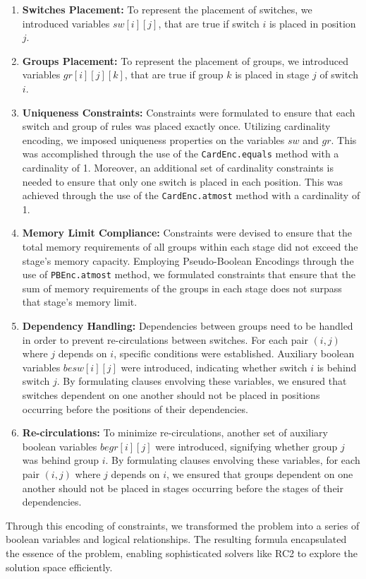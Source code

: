 \begin{enumerate}
    \item \textbf{Switches Placement:} To represent the placement of switches, we introduced variables \(sw[i][j]\), that are true if switch \(i\) is placed in position \(j\).

    \item \textbf{Groups Placement:} To represent the placement of groups, we introduced variables \(gr[i][j][k]\), that are true if group \(k\) is placed in stage \(j\) of switch \(i\).

    \item \textbf{Uniqueness Constraints:} Constraints were formulated to ensure that each switch and group of rules was placed exactly once. Utilizing cardinality encoding, we imposed uniqueness properties on the variables \(sw\) and \(gr\). This was accomplished through the use of the \texttt{CardEnc.equals} method with a cardinality of 1. Moreover, an additional set of cardinality constraints is needed to ensure that only one switch is placed in each position. This was achieved through the use of the \texttt{CardEnc.atmost} method with a cardinality of 1.

    \item \textbf{Memory Limit Compliance:} Constraints were devised to ensure that the total memory requirements of all groups within each stage did not exceed the stage's memory capacity. Employing Pseudo-Boolean Encodings through the use of \texttt{PBEnc.atmost} method, we formulated constraints that ensure that the sum of memory requirements of the groups in each stage does not surpass that stage's memory limit.

    \item \textbf{Dependency Handling:} Dependencies between groups need to be handled in order to prevent re-circulations between switches. For each pair \((i, j)\) where \(j\) depends on \(i\), specific conditions were established. Auxiliary boolean variables \(besw[i][j]\) were introduced, indicating whether switch \(i\) is behind switch \(j\). By formulating clauses envolving these variables, we ensured that switches dependent on one another should not be placed in positions occurring before the positions of their dependencies.

    \item \textbf{Re-circulations:} To minimize re-circulations, another set of auxiliary boolean variables \(begr[i][j]\) were introduced, signifying whether group \(j\) was behind group \(i\). By formulating clauses envolving these variables, for each pair \((i, j)\) where \(j\) depends on \(i\), we ensured that groups dependent on one another should not be placed in stages occurring before the stages of their dependencies.
\end{enumerate}

Through this encoding of constraints, we transformed the problem into a series of boolean variables and logical relationships. The resulting formula encapsulated the essence of the problem, enabling sophisticated solvers like RC2 to explore the solution space efficiently.